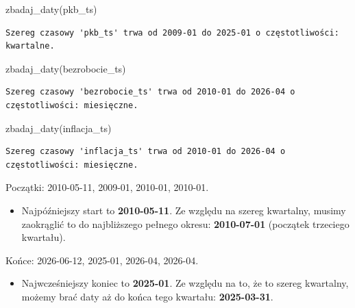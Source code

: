 \documentclass[
  polish,
  letterpaper,
  DIV=11,
  numbers=noendperiod]{scrartcl}
\newenvironment{Shaded}{\begin{snugshade}}{\end{snugshade}}
\newcommand{\FunctionTok}[1]{\textcolor[rgb]{0.28,0.35,0.67}{#1}}
\newcommand{\NormalTok}[1]{\textcolor[rgb]{0.00,0.23,0.31}{#1}}
\providecommand{\tightlist}{%
  \setlength{\itemsep}{0pt}\setlength{\parskip}{0pt}}
\begin{document}
\begin{Shaded}
\begin{Highlighting}[]
\FunctionTok{zbadaj\_daty}\NormalTok{(pkb\_ts)}
\end{Highlighting}
\end{Shaded}

\begin{verbatim}
Szereg czasowy 'pkb_ts' trwa od 2009-01 do 2025-01 o częstotliwości: kwartalne. 
\end{verbatim}

\begin{Shaded}
\begin{Highlighting}[]
\FunctionTok{zbadaj\_daty}\NormalTok{(bezrobocie\_ts)}
\end{Highlighting}
\end{Shaded}

\begin{verbatim}
Szereg czasowy 'bezrobocie_ts' trwa od 2010-01 do 2026-04 o częstotliwości: miesięczne. 
\end{verbatim}

\begin{Shaded}
\begin{Highlighting}[]
\FunctionTok{zbadaj\_daty}\NormalTok{(inflacja\_ts)}
\end{Highlighting}
\end{Shaded}

\begin{verbatim}
Szereg czasowy 'inflacja_ts' trwa od 2010-01 do 2026-04 o częstotliwości: miesięczne. 
\end{verbatim}

Początki: 2010-05-11, 2009-01, 2010-01, 2010-01.

\begin{itemize}
\tightlist
\item
  Najpóźniejszy start to \textbf{2010-05-11}. Ze względu na szereg
  kwartalny, musimy zaokrąglić to do najbliższego pełnego okresu:
  \textbf{2010-07-01} (początek trzeciego kwartału).
\end{itemize}

Końce: 2026-06-12, 2025-01, 2026-04, 2026-04.

\begin{itemize}
\tightlist
\item
  Najwcześniejszy koniec to \textbf{2025-01}. Ze względu na to, że to
  szereg kwartalny, możemy brać daty aż do końca tego kwartału:
  \textbf{2025-03-31}.
\end{itemize}
\end{document}
